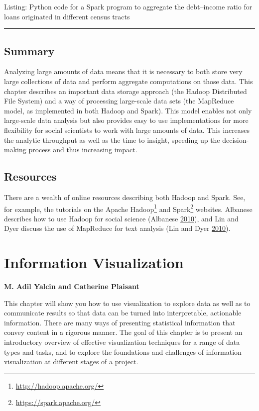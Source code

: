 \documentclass[]{krantz}
\begin{document}
Listing: Python code for a Spark program to aggregate the debt--income
ratio for loans originated in different census tracts

\begin{center}\rule{0.5\linewidth}{\linethickness}\end{center}

\section{Summary}\label{summary-3}

Analyzing large amounts of data means that it is necessary to both store
very large collections of data and perform aggregate computations on
those data. This chapter describes an important data storage approach
(the Hadoop Distributed File System) and a way of processing large-scale
data sets (the MapReduce model, as implemented in both Hadoop and
Spark). This model enables not only large-scale data analysis but also
provides easy to use implementations for more flexibility for social
scientists to work with large amounts of data. This increases the
analytic throughput as well as the time to insight, speeding up the
decision-making process and thus increasing impact.

\section{Resources}\label{resources-2}

There are a wealth of online resources describing both Hadoop and Spark.
See, for example, the tutorials on the Apache Hadoop\footnote{\url{http://hadoop.apache.org/}}
and Spark\footnote{\url{https://spark.apache.org/}} websites. Albanese
describes how to use Hadoop for social science (Albanese
\protect\hyperlink{ref-socialhadoop}{2010}), and Lin and Dyer discuss
the use of MapReduce for text analysis (Lin and Dyer
\protect\hyperlink{ref-lin2010data}{2010}).

\hypertarget{chap:viz}{\chapter{Information
Visualization}\label{chap:viz}}

\textbf{M. Adil Yalcin and Catherine Plaisant}

This chapter will show you how to use visualization to explore data as
well as to communicate results so that data can be turned into
interpretable, actionable information. There are many ways of presenting
statistical information that convey content in a rigorous manner. The
goal of this chapter is to present an introductory overview of effective
visualization techniques for a range of data types and tasks, and to
explore the foundations and challenges of information visualization at
different stages of a project.
\end{document}
